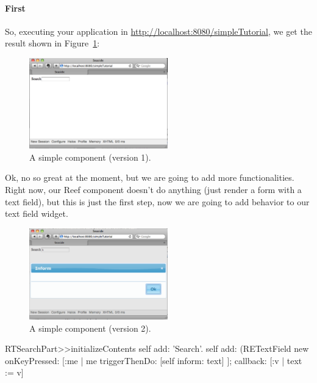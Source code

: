 \documentclass[a4paper,10pt,twoside]{book}
\begin{document}
\paragraph{First }

So, executing your application in \url{http://localhost:8080/simpleTutorial}, we get the result shown in Figure~\ref{first}:

\begin{figure}[h]
\begin{center}
\includegraphics[width=6cm]{SearchPartV1}
\caption{A simple component (version 1).\label{first}}
\end{center}
\end{figure}

Ok, no so great at the moment, but we are going to add more functionalities.
Right now, our Reef component doesn't do anything (just render a form with a text field), but this is 
just the first step, now we are going to add behavior to our text field widget.


\begin{figure}[h]
\begin{center}
\includegraphics[width=6cm]{SearchPartV2}
\caption{A simple component (version 2).\label{second}}
\end{center}
\end{figure}


\begin{code}{}
RTSearchPart>>initializeContents
	self add: 'Search'.
	self add: (RETextField new
		onKeyPressed: [:me | me triggerThenDo: [self inform: text] ];
		callback: [:v | text := v]
\end{code}

\end{document}
